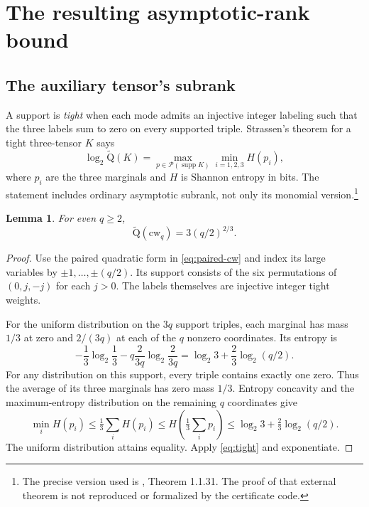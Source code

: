 \documentclass[11pt]{article}
\newtheorem{lemma}[theorem]{Lemma}
\theoremstyle{definition}\newtheorem{definition}[theorem]{Definition}
\newcommand{\AQ}{\widetilde{\mathrm Q}}
\newcommand{\cw}{\mathrm{cw}}
\newcommand{\supp}{\operatorname{supp}}
\begin{document}
\section{The resulting asymptotic-rank bound}\label{sec:bound}
\subsection{The auxiliary tensor's subrank}\label{sec:subrank}
A support is \emph{tight} when each mode admits an injective integer labeling such that the three labels sum to zero on every supported triple. Strassen's theorem for a tight three-tensor $K$ says
\begin{equation}\label{eq:tight}
\log_2\AQ(K)=
\max_{p\in\mathcal P(\supp K)}\min_{i=1,2,3}H(p_i),
\end{equation}
where $p_i$ are the three marginals and $H$ is Shannon entropy in bits. The statement includes ordinary asymptotic subrank, not only its monomial version.\footnote{The precise version used is \cite{cvz}, Theorem 1.1.31. The proof of that external theorem is not reproduced or formalized by the certificate code.}

\begin{lemma}\label{lem:cwsubrank}
For even $q\ge2$,
\begin{equation}\label{eq:cwsubrank}
\AQ(\cw_q)=3(q/2)^{2/3}.
\end{equation}
\end{lemma}
\begin{proof}
Use the paired quadratic form in \eqref{eq:paired-cw} and index its large variables by $\pm1,\ldots,\pm(q/2)$. Its support consists of the six permutations of $(0,j,-j)$ for each $j>0$. The labels themselves are injective integer tight weights.

For the uniform distribution on the $3q$ support triples, each marginal has mass $1/3$ at zero and $2/(3q)$ at each of the $q$ nonzero coordinates. Its entropy is
\[
-\frac13\log_2\frac13-q\frac{2}{3q}\log_2\frac{2}{3q}
=\log_2 3+\frac23\log_2(q/2).
\]
For any distribution on this support, every triple contains exactly one zero. Thus the average of its three marginals has zero mass $1/3$. Entropy concavity and the maximum-entropy distribution on the remaining $q$ coordinates give
\[
\min_i H(p_i)\le\tfrac13\sum_iH(p_i)
\le H\!\left(\tfrac13\sum_i p_i\right)
\le\log_2 3+\tfrac23\log_2(q/2).
\]
The uniform distribution attains equality. Apply \eqref{eq:tight} and exponentiate.
\end{proof}
\end{document}
